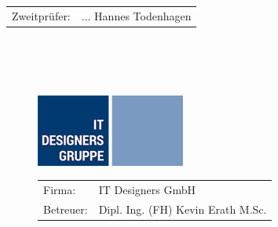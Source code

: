 \begin{titlepage}
\begin{tabular}{rl}
		Zweitprüfer: & ... Hannes Todenhagen\\
	\end{tabular}
	~\\ ~\\ ~\\	
	\begin{figure}[H]
		\begin{minipage}{0.4\textwidth}
			\begin{center}
				\includegraphics[width=.8\textwidth]{images/itd_logo}
			\end{center}
		\end{minipage}%
		\begin{minipage}{0.7\textwidth}
			\begin{tabular}{ll}
				Firma: & IT Designers GmbH\\
				Betreuer: & Dipl. Ing. (FH) Kevin Erath M.Sc.
			\end{tabular}
		\end{minipage}
	\end{figure}
\end{titlepage}





